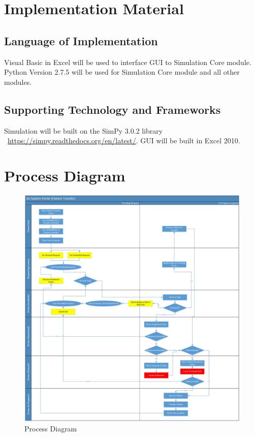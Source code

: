 \documentclass[paper=letter, fontsize=10pt]{scrartcl}
\numberwithin{equation}{section}		%
\numberwithin{figure}{section}			%
\numberwithin{table}{section}				%
\begin{document}
\section{Implementation Material}
\subsection{Language of Implementation}
Visual Basic in Excel will be used to interface GUI to Simulation Core module. Python Version 2.7.5 will be used for Simulation Core module and all other modules.
\subsection{Supporting Technology and Frameworks}
Simulation will be built on the SimPy 3.0.2 library \ \underline{\url{https://simpy.readthedocs.org/en/latest/}}. GUI will be built in Excel 2010. 
\newpage
\section{Process Diagram}
\begin{figure}[h!]
	\begin{center}
		\includegraphics[width=1\columnwidth]{../Process_Diagrams/Process_Diagram.jpg}
		\caption{Process Diagram}
	\end{center}
\end{figure}
\end{document}

